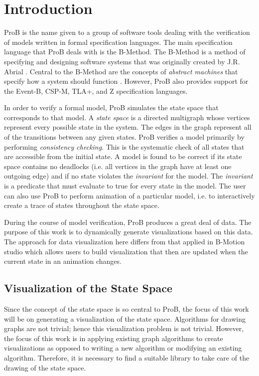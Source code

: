 \section{Introduction}

ProB is the name given to a group of software tools dealing with the verification of models written in formal specification languages. The main specification language that ProB deals with is the B-Method. The B-Method is a method of specifying and designing software systems that was originally created by J.R. Abrial \cite{abrial2005b}. Central to the B-Method are the concepts of \emph{abstract machines} that specify how a system should function \cite{schneider2001b}. However, ProB also provides support for the Event-B, CSP-M, TLA+, and Z specification languages. 

In order to verify a formal model, ProB simulates the state space that corresponds to that model. A \emph{state space} is a directed multigraph whose vertices represent every possible state in the system. The edges in the graph represent all of the transitions between any given states. ProB verifies a model primarily by performing \emph{consistency checking}. This is the systematic check of all states that are accessible from the initial state. A model is found to be correct if its state space contains no deadlocks (i.e. all vertices in the graph have at least one outgoing edge) and if no state violates the \emph{invariant} for the model. The \emph{invariant} is a predicate that must evaluate to true for every state in the model. The user can also use ProB to perform animation of a particular model, i.e. to interactively create a trace of states throughout the state space.

During the course of model verification, ProB produces a great deal of data. The purpose of this work is to dynamically generate visualizations based on this data. The approach for data visualization here differs from that applied in B-Motion studio \cite{LaBeLe09_258} which allows users to build visualization that then are updated when the current state in an animation changes.

\subsection{Visualization of the State Space}

Since the concept of the state space is so central to ProB, the focus of this work will be on generating a visualization of the state space. Algorithms for drawing graphs are not trivial; hence this visualization problem is not trivial. However, the focus of this work is in applying existing graph algorithms to create visualizations as opposed to writing a new algorithm or modifying an existing algorithm. Therefore, it is necessary to find a suitable library to take care of the drawing of the state space.

